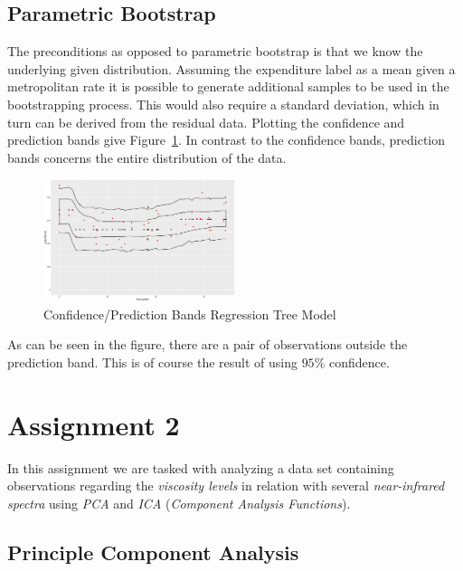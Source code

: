 \documentclass[a4paper, twocolumn]{article}
\begin{document}
    \subsection*{Parametric Bootstrap}

        The preconditions as opposed to parametric bootstrap is that we know the underlying given distribution. Assuming the expenditure label as a mean given a metropolitan rate it is possible to generate additional samples to be used in the bootstrapping process. This would also require a standard deviation, which in turn can be derived from the residual data. Plotting the confidence and prediction bands give Figure~\ref{fig:confpred_bands}. In contrast to the confidence bands, prediction bands concerns the entire distribution of the data.

        \begin{figure}[h!]
            \centering
            \caption{Confidence/Prediction Bands Regression Tree Model}
            \label{fig:confpred_bands}
            \includegraphics[width=0.5\textwidth]{share/A1_parametric.eps}
        \end{figure}

        As can be seen in the figure, there are a pair of observations outside the prediction band. This is of course the result of using $95\%$ confidence.

    \section*{Assignment 2}

        In this assignment we are tasked with analyzing a data set containing observations regarding the \emph{viscosity levels} in relation with several \emph{near-infrared spectra} using \emph{PCA} and \emph{ICA} (\emph{Component Analysis Functions}).

    \subsection*{Principle Component Analysis}
\end{document}
